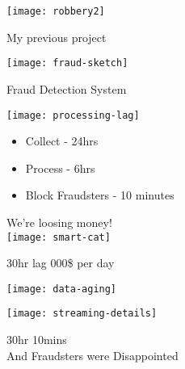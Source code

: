 \documentclass[aspectratio=169, 15pt,usenames,dvipsnames]{beamer}
\begin{document}
\begin{gdsw}
	\centering\texttt{[image: robbery2]} 
	\par
	\LARGE My previous project
\end{gdsw}
\begin{gdsw}
	\centering\texttt{[image: fraud-sketch]} 
	\par
	\LARGE Fraud Detection System
\end{gdsw}
\begin{gdsw}
	\centering\texttt{[image: processing-lag]} 
	\par
	\begin{center}
		\begin{minipage}{.5\textwidth}		
			\begin{itemize}
				\item Collect - 24hrs
				\item Process - 6hrs
				\item Block Fraudsters - 10 minutes
			\end{itemize}
		\end{minipage}
	\end{center}
\end{gdsw}	
\begin{gdsw}
	\centering\Large We're loosing money!\\
	\texttt{[image: smart-cat]} 
	\par\centering
	\pause
	30hr lag  000\$ per day
\end{gdsw}
\begin{gdsw}
\end{gdsw}	
\begin{gdsw}
\end{gdsw}
\begin{gdsw}
	\centering\texttt{[image: data-aging]} 
\end{gdsw}
\begin{gdsw}
	\centering\texttt{[image: streaming-details]} 
	\par\pause\Large
	30hr \rightarrow \Rightarrow 10mins\\
	And Fraudsters were Disappointed
\end{gdsw}
\end{document}

